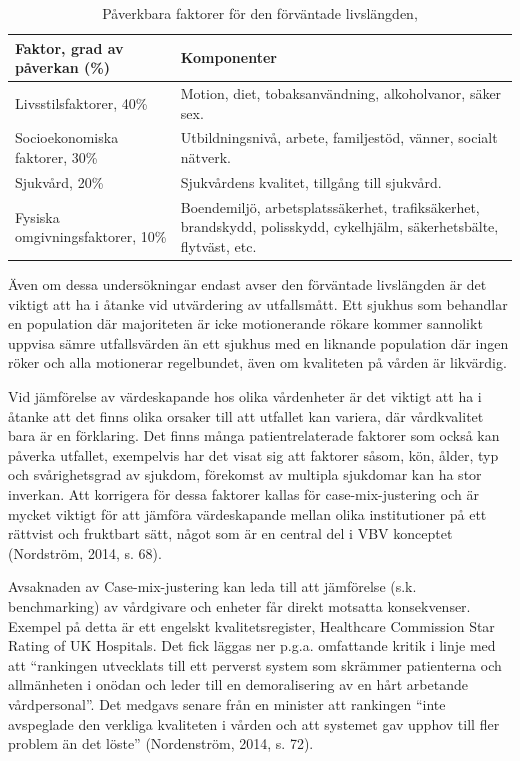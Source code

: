 \begin{table}[h]
\centering
\caption{Påverkbara faktorer för den förväntade livslängden,}
\label{tab:livslangd}
\begin{tabular}{|p{6cm}|p{6cm}|}
\hline
Faktor, grad av påverkan (\%)    & Komponenter                                                                                                                        \\ \hline
Livsstilsfaktorer, 40\%          & Motion, diet, tobaksanvändning, alkoholvanor, säker sex.                                                                           \\ \hline
Socioekonomiska faktorer, 30\%   & Utbildningsnivå, arbete, familjestöd, vänner, socialt nätverk.                                                                     \\ \hline
Sjukvård, 20\%                   & Sjukvårdens kvalitet, tillgång till sjukvård. \\ \hline

Fysiska omgivningsfaktorer, 10\% & Boendemiljö, arbetsplatssäkerhet, trafiksäkerhet, brandskydd, polisskydd, cykelhjälm, säkerhetsbälte, flytväst, etc.               \\ \hline
\end{tabular}
\end{table}

Även om dessa undersökningar endast avser den förväntade livslängden är det viktigt att ha i åtanke vid utvärdering av utfallsmått. Ett sjukhus som behandlar en population där majoriteten är icke motionerande rökare kommer sannolikt uppvisa sämre utfallsvärden än ett sjukhus med en liknande population där ingen röker och alla motionerar regelbundet, även om kvaliteten på vården är likvärdig.

Vid jämförelse av värdeskapande hos olika vårdenheter är det viktigt att ha i åtanke att det finns olika orsaker till att utfallet kan variera, där vårdkvalitet bara är en förklaring. Det finns många patientrelaterade faktorer som också kan påverka utfallet, exempelvis har det visat sig att faktorer såsom, kön, ålder, typ och svårighetsgrad av sjukdom, förekomst av multipla sjukdomar kan ha stor inverkan. Att korrigera för dessa faktorer kallas för case-mix-justering och är mycket viktigt för att jämföra värdeskapande mellan olika institutioner på ett rättvist och fruktbart sätt, något som är en central del i VBV konceptet (Nordström, 2014, s. 68).

Avsaknaden av Case-mix-justering kan leda till att jämförelse (s.k. benchmarking) av vårdgivare och enheter får direkt motsatta konsekvenser. Exempel på detta är ett engelskt kvalitetsregister, Healthcare Commission Star Rating of UK Hospitals. Det fick läggas ner p.g.a. omfattande kritik i linje med att “rankingen utvecklats till ett perverst system som skrämmer patienterna och allmänheten i onödan och leder till en demoralisering av en hårt arbetande vårdpersonal”. Det medgavs senare från en minister att rankingen “inte avspeglade den verkliga kvaliteten i vården och att systemet gav upphov till fler problem än det löste” (Nordenström, 2014, s. 72).

